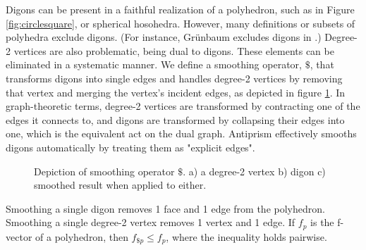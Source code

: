 \documentclass{amsart}[12pt]
\begin{document}
Digons can be present in a faithful realization of a polyhedron, such as in
Figure \ref{fig:circlesquare}, or spherical hosohedra. However, many
definitions or subsets of polyhedra exclude digons. (For instance, Gr\"unbaum
excludes digons in \cite{grunbaum03}.) Degree-2 vertices are also problematic,
being dual to digons. These elements can be eliminated in a systematic manner.
We define a smoothing operator, $\$$, that transforms digons into single edges
and handles degree-2 vertices by removing that vertex and merging the vertex's
incident edges, as depicted in figure \ref{fig:smooth}. In graph-theoretic
terms, degree-2 vertices are transformed by contracting one of the edges it
connects to, and digons are transformed by collapsing their edges into one,
which is the equivalent act on the dual graph. \cite{gross} Antiprism
effectively smooths digons automatically by treating them as "explicit edges".

\begin{figure}

\caption{Depiction of smoothing operator $\$$. a) a degree-2 vertex b) digon c)
        smoothed result when applied to either.}
\label{fig:smooth}
\end{figure}

Smoothing a single digon removes 1 face and 1 edge from the polyhedron.
Smoothing a single degree-2 vertex removes 1 vertex and 1 edge.
If $f_p$ is the f-vector of a polyhedron, then $f_{\$p} \le f_p$, where the
inequality holds pairwise.
\end{document}
